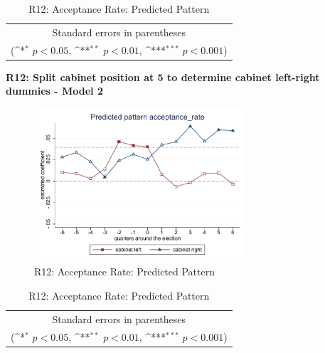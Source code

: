 \documentclass[10pt,a4paper]{scrartcl}
\begin{document}
\begin{table}[!ht]\centering
	\renewcommand{\arraystretch}{1.25}
	\def\sym#1{\ifmmode^{#1}\else\(^{#1}\)\fi}
	\caption{R12: Acceptance Rate: Predicted Pattern}
	\begin{tabular}{l*{2}{c}}
		\hline\hline
		
		\hline\hline
		\multicolumn{3}{c}{\footnotesize Standard errors in parentheses} \\
		\multicolumn{3}{c}{\footnotesize (\sym{*} \(p<0.05\), \sym{**} \(p<0.01\), \sym{***} \(p<0.001\))}\\
	\end{tabular}
\end{table}

\clearpage
\textbf{R12: Split cabinet position at 5 to determine cabinet left-right dummies - Model 2}
\begin{figure}[!ht]
	\centering
	\includegraphics[width=0.7\textwidth]{figures_edited/acceptance_rate_graph2_R12.pdf}
	\caption{R12: Acceptance Rate: Predicted Pattern}
\end{figure}

\begin{table}[!ht]\centering
	\footnotesize
	\renewcommand{\arraystretch}{1.2}
	\def\sym#1{\ifmmode^{#1}\else\(^{#1}\)\fi}
	\caption{R12: Acceptance Rate: Predicted Pattern}
	\begin{tabular}{l*{2}{c}}
		\hline\hline
		
		\hline\hline
		\multicolumn{3}{c}{\footnotesize Standard errors in parentheses} \\
		\multicolumn{3}{c}{\footnotesize (\sym{*} \(p<0.05\), \sym{**} \(p<0.01\), \sym{***} \(p<0.001\))} \\
	\end{tabular}
\end{table}
\end{document}
